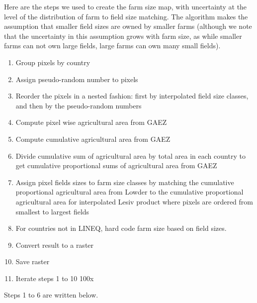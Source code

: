 \documentclass{article}
\begin{document}
Here are the steps we used to create the farm size map, with uncertainty at the level of the distribution of farm to field size matching. The algorithm makes the assumption that smaller field sizes are owned by smaller farms (although we note that the uncertainty in this assumption grows with farm size, as while smaller farms can not own large fields, large farms can own many small fields).

\begin{enumerate}
  \item Group pixels by country
  \item Assign pseudo-random number to pixels
  \item Reorder the pixels in a nested fashion: first by interpolated field size classes, and then by the pseudo-random numbers
  \item Compute pixel wise agricultural area from GAEZ
  \item Compute cumulative agricultural area from GAEZ
  \item Divide cumulative sum of agricultural area by total area in each country to get cumulative proportional sums of agricultural area from GAEZ
  \item Assign pixel fields sizes to farm size classes by matching the cumulative proportional agricultural area from Lowder to the cumulative proportional agricultural area for interpolated Lesiv product  where pixels are ordered from smallest to largest fields
  \item For countries not in LINEQ, hard code farm size based on field sizes.
  \item Convert result to a raster
  \item Save raster
  \item Iterate steps 1 to 10 100x
\end{enumerate}


Steps 1 to 6 are written below.

\begin{Schunk}
\end{Schunk}
\end{document}
